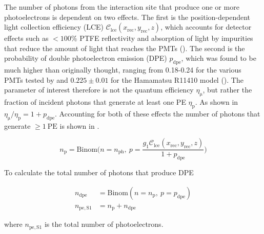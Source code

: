 The number of photons from the interaction site that produce one or more photoelectrons is dependent on two effects.  The first is
the position-dependent light collection efficiency (LCE) $\mathcal{C}_{\mathrm{lce}}(x_{\mathrm{rec}}, y_{\mathrm{rec}}, z)$, which
accounts for detector effects such as $<100\%$ PTFE reflectivity and
absorption of light by impurities that reduce the amount of light that reaches the PMTs
().  The second is the probability of double photoelectron emission (DPE) $p_{\mathrm{dpe}}$, which was found
to be much higher than originally thought, ranging from 0.18-0.24 for the various PMTs tested by  and $0.225 \pm 0.01$
for the Hamamatsu R11410 model ().  The parameter of interest therefore is not the quantum efficiency
$\eta_{\mathrm{\mu}}$, but rather the
fraction of incident photons that generate at least one PE $\eta_{\mathrm{p}}$.  As shown in 
$\eta_{\mathrm{\mu}} / \eta_{\mathrm{p}} = 1 + p_{\mathrm{dpe}}$.  Accounting for both of these effects the number of photons that
generate $\geq 1\ \mathrm{PE}$ is shown in .

\begin{equation}
n_{\mathrm{p}} = \mathrm{Binom} \bigg( n = n_{\mathrm{ph}},\ p =
\frac{g_1 \mathcal{C}_{\mathrm{lce}}(x_{\mathrm{rec}}, y_{\mathrm{rec}}, z)}{1 + p_{\mathrm{dpe}}} \bigg)
\label{eq:er_nr_calibrations_parameter_determ_det_phys_npe}
\end{equation}

To calculate the total number of photons that produce DPE

\vspace{-20pt}

\begin{subequations}
\begin{align}
n_{\mathrm{dpe}} &= \mathrm{Binom} (n = n_{\mathrm{p}},\ p = p_{\mathrm{dpe}} ) \\
n_{\mathrm{pe,S1}} &= n_{\mathrm{p}} + n_{\mathrm{dpe}}
\end{align}
\label{eq:er_nr_calibrations_parameter_determ_det_phys_num_pe}
\end{subequations}

\vspace{-20pt}

\noindent where $n_{\mathrm{pe,S1}}$ is the total number of photoelectrons.

